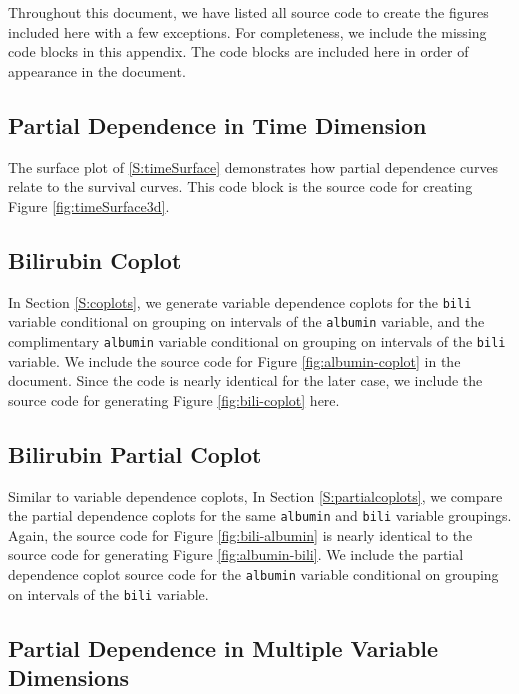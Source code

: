 \documentclass[article, nojss]{jss}
\begin{document}
Throughout this document, we have listed all  source code to
create the figures included here with a few exceptions. For
completeness, we include the missing code blocks in this appendix. The
code blocks are included here in order of appearance in the document.

\subsection{Partial Dependence in Time
Dimension}\label{partial-dependence-in-time-dimension}

The surface plot of \ref{S:timeSurface} demonstrates how partial
dependence curves relate to the survival curves. This code block is the
 source code for creating Figure \ref{fig:timeSurface3d}.

\subsection{Bilirubin Coplot}\label{bilirubin-coplot}

In Section \ref{S:coplots}, we generate variable dependence coplots for
the \texttt{bili} variable conditional on grouping on intervals of the
\texttt{albumin} variable, and the complimentary \texttt{albumin}
variable conditional on grouping on intervals of the \texttt{bili}
variable. We include the source code for Figure \ref{fig:albumin-coplot}
in the document. Since the code is nearly identical for the later case,
we include the source code for generating Figure \ref{fig:bili-coplot}
here.

\subsection{Bilirubin Partial Coplot}\label{bilirubin-partial-coplot}

Similar to variable dependence coplots, In Section
\ref{S:partialcoplots}, we compare the partial dependence coplots for
the same \texttt{albumin} and \texttt{bili} variable groupings. Again,
the source code for Figure \ref{fig:bili-albumin} is nearly identical to
the source code for generating Figure \ref{fig:albumin-bili}. We include
the partial dependence coplot source code for the \texttt{albumin}
variable conditional on grouping on intervals of the \texttt{bili}
variable.

\subsection{Partial Dependence in Multiple Variable
Dimensions}\label{partial-dependence-in-multiple-variable-dimensions}
\end{document}
